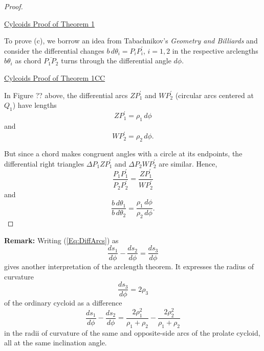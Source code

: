 \documentclass{ximera}
\begin{document}
\begin{proof}
\begin{onlineOnly}
    \begin{center}
\end{center}
\end{onlineOnly}

\href{https://www.desmos.com/calculator/txbihum5r3}{Cylcoids Proof of Theorem 1}

To prove (c), we borrow an idea from Tabachnikov's \emph{Geometry and Billiards} and consider the differential changes $b\, d\theta_i = P_iP_i^\prime$, $i = 1,2$  in the respective arclengths $b\theta_i$ as chord $\overline{P_1P_2}$ turns through the differential angle $d\phi$.  

\begin{onlineOnly}
    \begin{center}
\end{center}
\end{onlineOnly}

\href{https://www.desmos.com/calculator/ffj1pwg96n}{Cylcoids Proof of Theorem 1CC} %


In Figure ?? above, the differential arcs $ZP_1^\prime$ and $WP_2^\prime$ (circular arcs centered at $Q_1$) have lengths
\[
    ZP_1^\prime = \rho_1 \, d\phi
\]
and
\[
  WP_2^\prime =  \rho_2 \, d\phi.
\]

But since a chord makes congruent angles with a circle at its endpoints, the differential right triangles $\Delta P_1ZP_1^\prime$ and $\Delta P_2 W P_2^\prime$ are similar. Hence,
\[
      \frac{P_1P_1^\prime}{P_2 P_2^\prime}  =  \frac{ZP_1^\prime}{WP_2^\prime} 
\]
and
\[
    \frac{b\, d\theta_1}{b \, d\theta_2} = \frac{ \rho_1 \, d\phi}{ \rho_2 \, d\phi} .
\]
 
\end{proof}

{\bf Remark:} Writing (\ref{Eq:DiffArcs}) as
\[
   \frac{ds_1}{d\phi} - \frac{ds_2}{d\phi} = \frac{ds_3}{d\phi}
\]
gives another interpretation of the arclength theorem. It expresses the radius of curvature 
\[
  \frac{ds_3}{d\phi} = 2 \rho_3
\]
of the ordinary cycloid as a difference 
\[
   \frac{ds_1}{d\phi} - \frac{ds_2}{d\phi} = \frac{2\rho_1^2}{\rho_1+\rho_2} - \frac{2\rho_2^2}{\rho_1+\rho_2}
\]
in the radii of curvature of the same and opposite-side arcs of the prolate cycloid, all at the same inclination angle.%
\end{document}
